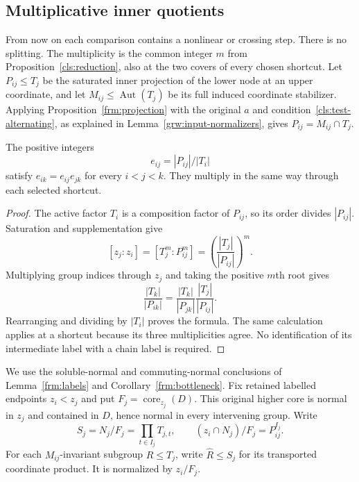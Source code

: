 \subsection{Multiplicative inner quotients}

From now on each comparison contains a nonlinear or crossing step.
There is no splitting.  The multiplicity is the common integer $m$
from Proposition~\ref{cls:reduction}, also at the two covers of every
chosen shortcut.  Let $P_{ij}\le T_j$ be the saturated inner projection
of the lower node at an upper coordinate, and let
$M_{ij}\le\operatorname{Aut}(T_j)$ be its full induced coordinate
stabilizer.  Applying Proposition~\ref{frm:projection} with the
original $a$ and condition~\ref{cls:test-alternating}, as explained
in Lemma~\ref{grw:input-normalizers}, gives
$P_{ij}=M_{ij}\cap T_j$.

\begin{lemma}\label{grw:indices}
The positive integers
\[
 e_{ij}=|P_{ij}|/|T_i|
\]
satisfy $e_{ik}=e_{ij}e_{jk}$ for every $i<j<k$.  They multiply in the
same way through each selected shortcut.
\end{lemma}

\begin{proof}
The active factor $T_i$ is a composition factor of $P_{ij}$, so its
order divides $|P_{ij}|$.  Saturation and supplementation give
\[
 [z_j:z_i]=[T_j^m:P_{ij}^m]
 =\left(\frac{|T_j|}{|P_{ij}|}\right)^m.
\]
Multiplying group indices through $z_j$ and taking the positive $m$th
root gives
\[
 \frac{|T_k|}{|P_{ik}|}
 =\frac{|T_k|}{|P_{jk}|}\frac{|T_j|}{|P_{ij}|}.
\]
Rearranging and dividing by $|T_i|$ proves the formula.  The same
calculation applies at a shortcut because its three multiplicities
agree.  No identification of its intermediate label with a chain label
is required.
\end{proof}

We use the soluble-normal and commuting-normal conclusions of
Lemma~\ref{frm:labels} and Corollary~\ref{frm:bottleneck}.
Fix retained labelled endpoints $z_i<z_j$ and put
$F_j=\operatorname{core}_{z_j}(D)$.  This original higher core is
normal in $z_j$ and contained in $D$, hence normal in every
intervening group.  Write
\[
 S_j=N_j/F_j=\prod_{t\in I_j}T_{j,t},\qquad
 (z_i\cap N_j)/F_j=P_{ij}^{I_j}.
\]
For each $M_{ij}$-invariant subgroup $R\le T_j$, write
$\widehat R\le S_j$ for its transported coordinate product.
It is normalized by $z_i/F_j$.

